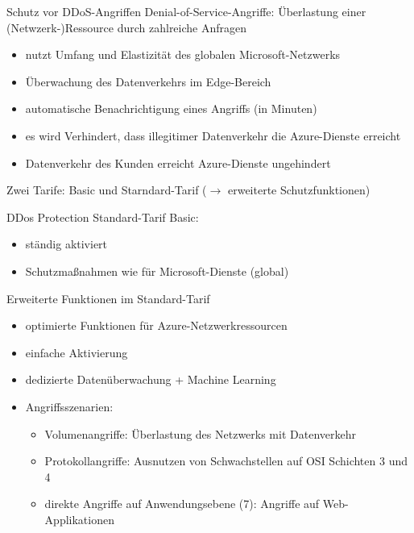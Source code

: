 \begin{flashcard}[Beschreibung]{Schutz vor DDoS-Angriffen}
    Denial-of-Service-Angriffe: Überlastung einer (Netwzerk-)Ressource durch zahlreiche Anfragen
    \begin{itemize}
        \item nutzt Umfang und Elastizität des globalen Microsoft-Netzwerks
        \item Überwachung des Datenverkehrs im Edge-Bereich
        \item automatische Benachrichtigung eines Angriffs (in Minuten)
        \item es wird Verhindert, dass illegitimer Datenverkehr die Azure-Dienste erreicht
        \item Datenverkehr des Kunden erreicht Azure-Dienste ungehindert
    \end{itemize}
    Zwei Tarife: Basic und Starndard-Tarif ($\rightarrow$ erweiterte Schutzfunktionen)
\end{flashcard}

\begin{flashcard}[Beschreibung]{DDos Protection Standard-Tarif}
    Basic:
    \begin{itemize}
        \item ständig aktiviert
        \item Schutzmaßnahmen wie für Microsoft-Dienste (global)
    \end{itemize}

    Erweiterte Funktionen im Standard-Tarif
    \begin{itemize}
        \item optimierte Funktionen für Azure-Netzwerkressourcen
        \item einfache Aktivierung
        \item dedizierte Datenüberwachung + Machine Learning
        \item Angriffsszenarien:
        \begin{itemize}
            \item Volumenangriffe: Überlastung des Netzwerks mit Datenverkehr
            \item Protokollangriffe: Ausnutzen von Schwachstellen auf OSI Schichten 3 und 4
            \item direkte Angriffe auf Anwendungsebene (7): Angriffe auf Web-Applikationen
        \end{itemize}

    \end{itemize}
\end{flashcard}

